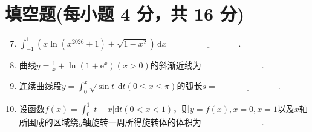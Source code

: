 \documentclass[../Main.tex]{subfiles}
\begin{document}
\section{填空题(每小题 4 分，共 16 分)}
\begin{enumerate}
    \setcounter{enumi}{6}
    \item $\int_{-1}^{1}\left(x\ln\left(x^{2026}+1\right)+\sqrt{1-x^{2}}\right
              )\,\mathrm{d}x=\underline{\hspace{3cm}}$.
          \vspace{1em}

    \item 曲线$y=\frac{1}{x}+\ln\left(1+\mathrm{e}^{x}\right)(x>0)$的斜渐近线为$\underline
              {\hspace{3cm}}$.
          \vspace{1em}

    \item 连续曲线段$y=\int_{0}^{x}\sqrt{\sin t}\,\mathrm{d}t(0\leq x\leq \pi)$的弧长$s
              =\underline{\hspace{3cm}}$.
          \vspace{1em}

    \item 设函数$f(x)=\int_{0}^{1}|t-x|\mathrm{d}t(0<x<1)$，则$y=f(x),x=0,x=
              1$以及$x$轴所围成的区域绕$y$轴旋转一周所得旋转体的体积为$\underline{\hspace{3cm}
              }$.
\end{enumerate}
\end{document}
